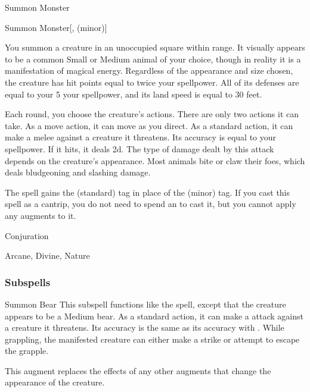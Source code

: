 \newpage
\begin{spellsection}{Summon Monster}

\begin{spellheader}
\end{spellheader}


\begin{ability}{Summon Monster}[,  (minor)]

You summon a creature in an unoccupied square within \rngmed range.
It visually appears to be a common Small or Medium animal of your choice, though in reality it is a manifestation of magical energy.
Regardless of the appearance and size chosen, the creature has hit points equal to twice your spellpower.
All of its defenses are equal to your 5 \add your spellpower, and its land speed is equal to 30 feet.

Each round, you choose the creature's actions.
There are only two actions it can take.
As a move action, it can move as you direct.
As a standard action, it can make a melee  against a creature it threatens.
Its accuracy is equal to your spellpower.
If it hits, it deals  \minus2d.
The type of damage dealt by this attack depends on the creature's appearance.
Most animals bite or claw their foes, which deals bludgeoning and slashing damage.

\end{ability}



 The spell gains the  (standard) tag in place of the  (minor) tag. If you cast this spell as a cantrip,
you do not need to spend an  to cast it,
but you cannot apply any augments to it.


 Conjuration

 Arcane, Divine, Nature
\end{spellsection}


\subsubsection{Subspells}


\begin{ability}[\nth{2}]{Summon Bear}
This subspell functions like the  spell, except that the creature appears to be a Medium bear.
As a standard action, it can make a  attack against a creature it threatens.
Its accuracy is the same as its accuracy with .
While grappling, the manifested creature can either make a strike or attempt to escape the grapple.

This augment replaces the effects of any other augments that change the appearance of the creature.
\end{ability}
\vspace{0.25em}

